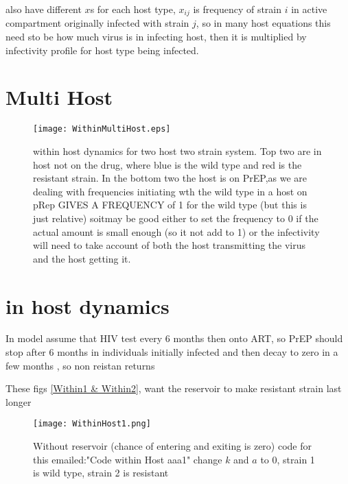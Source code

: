 \documentclass[twocolumn]{svjour3}          %
\begin{document}
also have different $x$s for each host type, $x_{ij}$ is frequency of strain $i$ in active compartment originally infected with strain $j$, so in many host equations this need sto be how much virus is in infecting host, then it is multiplied by infectivity profile for host type being infected.





\section{Multi Host}

\begin{figure*}
  \texttt{[image: WithinMultiHost.eps]}
\caption{within host dynamics for two host two strain system. Top  two are in host not on the drug, where blue is the wild type and red is  the resistant strain. In the bottom two the host is on PrEP,as we are dealing with frequencies initiating wth the wild type  in a host on pRep GIVES A FREQUENCY  of 1 for  the wild type  (but this is just relative) soitmay be good either to set the frequency to 0 if the actual amount is small enough (so it not add to 1) or the infectivity will need to take account of both the host transmitting the virus and the host getting it.}
\label{fig:noh}       %
\end{figure*}


\section{in host dynamics}

In model assume that HIV test every 6 months then onto ART, so PrEP should stop after 6 months in individuals initially infected and then decay to zero in a few months \cite{vandeVijer2013}, so non reistan returns 

These figs \ref{Within1 & Within2}, want the reservoir to make resistant strain last longer 


\begin{figure*}
  \texttt{[image: WithinHost1.png]}
\caption{Without reservoir (chance of entering and exiting is zero)  code for this emailed:"Code within Host aaa1" change $k$ and $a$ to $0$, strain 1 is wild type, strain 2 is resistant  }
\label{Within1}       %
\end{figure*}
\end{document}
